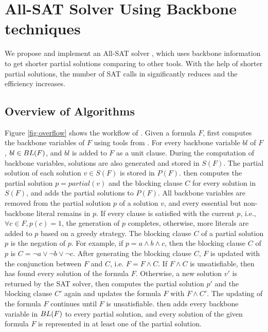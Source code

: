 \section{All-SAT Solver Using Backbone techniques} \label{sec:meth}
We propose and implement an All-SAT solver \tool, which uses backbone information to get shorter partial solutions comparing to other tools.
With the help of shorter partial solutions, the number of SAT calls in \tool significantly reduces and the efficiency increases.

\subsection{Overview of Algorithms}
Figure \ref{fig:overflow} shows the workflow of \tool.
Given a formula $F$, \tool first computes the backbone variables of $F$ using tools from \cite{bb}.
For every backbone variable $bl$ of $F$, $bl\in {\sc BL}(F)$, and $bl$ is added to $F$ as a unit clause. During the computation of backbone variables, solutions are also generated and stored in $S(F)$. The partial solution of each solution $v\in S(F)$ is stored in $P(F)$.
\tool then computes the partial solution $p=partial(v)$ and the blocking clause $C$ for every solution in $S(F)$, and adds the partial solutions to $P(F)$. 
All backbone variables are removed from the partial solution $p$ of a solution $v$, and every essential but non-backbone literal remains in $p$. If every clause is satisfied with the current $p$, i.e., $\forall c\in F, p(c)=1$, the generation of $p$ completes, otherwise, more literals are added to $p$ based on a greedy strategy.
The blocking clause $C$ of a partial solution $p$ is the negation of $p$. For example, if $p=a\wedge b \wedge c$, then the blocking clause $C$ of $p$ is $C=\neg a \vee \neg b \vee \neg c$.
After generating the blocking clause $C$, $F$ is updated with the conjunction between $F$ and $C$, i.e. $F=F\wedge C$.
If $F\wedge C$ is unsatisfiable, then \tool has found every solution of the formula $F$.
Otherwise, a new solution $v'$ is returned by the SAT solver, \tool then computes the partial solution $p'$ and the blocking clause $C'$ again and updates the formula $F$ with $F\wedge C'$.
The updating of the formula $F$ continues until $F$ is unsatisfiable.
\tool then adds every backbone variable in ${\sc BL}(F)$ to every partial solution, and every solution of the given formula $F$ is represented in at least one of the partial solution.


